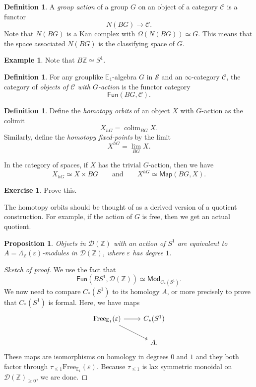 \documentclass[10pt, oneside]{memoir}
\newtheorem{prop}[thm]{Proposition}
\theoremstyle{definition}
\newtheorem{defn}[thm]{Definition}
\newtheorem{exm}[thm]{Example}
\newtheorem{exer}[thm]{Exercise}
\theoremstyle{remark}
\theoremstyle{plain}
\theoremstyle{definition}
\theoremstyle{remark}
\newcommand{\Z}{\mathbb{Z}}
\newcommand{\E}{\mathbb{E}}
\newcommand{\ep}{\varepsilon}
\newcommand{\mc}[1]{\mathcal{#1}}
\newcommand{\mr}[1]{\mathrm{#1}}
\newcommand{\ms}[1]{\mathsf{#1}}
\newcommand{\1}{\mathbf{1}}
\newcommand{\2}{\mathbf{2}}
\newcommand{\3}{\mathbf{3}}
\DeclareMathOperator*{\colim}{colim}
\begin{document}
\begin{defn}
    A \textit{group action} of a group $G$ on an object of a category $\mc{C}$ is a functor
    \[ N(BG) \to \mc{C}. \]
    Note that $N(BG)$ is a Kan complex with $\Omega(N(BG)) \simeq G$. This means that the space associated $N(BG)$ is the classifying space of $G$.
\end{defn}

\begin{exm}
    Note that $B\Z \simeq S^1$.
\end{exm}

\begin{defn}
    For any grouplike $\E_1$-algebra $G$ in $\mc{S}$ and an $\infty$-category $\mc{C}$, the category of \textit{objects of $\mc{C}$ with $G$-action} is the functor category
    \[ \ms{Fun}(BG, \mc{C}). \]
\end{defn}

\begin{defn}
    Define the \textit{homotopy orbits} of an object $X$ with $G$-action as the colimit
    \[ X_{hG} = \colim_{BG} X. \]
    Similarly, define the \textit{homotopy fixed-points} by the limit
    \[ X^{hG} = \lim_{BG} X. \]
\end{defn}

In the category of spaces, if $X$ has the trivial $G$-action, then we have
\[ X_{hG} \simeq X \times BG \qquad \text{and} \qquad X^{hG} \simeq \ms{Map}(BG, X). \]

\begin{exer}
    Prove this.
\end{exer}

The homotopy orbits should be thought of as a derived version of a quotient construction. For example, if the action of $G$ is free, then we get an actual quotient.

\begin{prop}
    Objects in $\mc{D}(\Z)$ with an action of $S^1$ are equivalent to $A = \Lambda_{\Z}(\ep)$-modules in $\mc{D}(\Z)$, where $\ep$ has degree $1$.
\end{prop}

\begin{proof}[Sketch of proof]
    We use the fact that
    \[ \ms{Fun}(BS^1, \mc{D}(\Z)) \simeq \ms{Mod}_{C_*(S^1)}. \]
    We now need to compare $C_*(S^1)$ to its homology $A$, or more precisely to prove that $C_*(S^1)$ is formal. Here, we have maps
    \begin{equation*}
    \begin{tikzcd}
        \mr{Free}_{\E_1}(\ep) \ar{r} \ar{dr} & C_*(S^1) \\
        & A.
    \end{tikzcd}
    \end{equation*}
    These maps are isomorphisms on homology in degrees $0$ and $1$ and they both factor through $\tau_{\leq 1} \mr{Free}_{\E_1}(\ep)$. Because $\tau_{\leq 1}$ is lax symmetric monoidal on $\mc{D}(\Z)_{\geq 0}$, we are done.
\end{proof}
\end{document}
